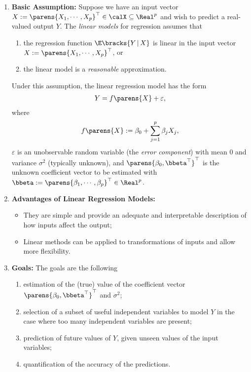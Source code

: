 \documentclass[12pt]{article}
\begin{document}
\begin{enumerate}[label=\textbf{\arabic*.}]

	\item \textbf{Basic Assumption:} Suppose we have an input vector $X := \parens{X_1, \cdots, X_{p}}^\top \in \calX \subseteq \Real^p$ and wish to predict a real-valued output $Y$. The \emph{linear models} for regression assumes that 
	\begin{enumerate}
		\item the regression function $\E \bracks{Y \,\vert\, X}$ is linear in the input vector $X := \parens{X_1, \cdots, X_{p}}^\top$, or 
		\item the linear model is a \textit{reasonable} approximation. 
	\end{enumerate}
	Under this assumption, the linear regression model has the form 
	\begin{align}\label{eq-linear-model}
		Y = f \parens{X} + \varepsilon, 
	\end{align}
	where 
	\begin{align}
		f \parens{X} := \beta_0 + \sum_{j=1}^{p} \beta_{j} X_j, 
	\end{align}
	$\varepsilon$ is an unobservable random variable (the \emph{error component}) with mean 0 and variance $\sigma^2$ (typically unknown), and $\parens{\beta_0, \bbeta^\top}^\top$ is the unknown coefficient vector to be estimated with $\bbeta := \parens{\beta_1, \cdots, \beta_{p}}^\top \in \Real^{p}$. 
	
	\item \textbf{Advantages of Linear Regression Models:} 
	\begin{itemize}
		\item They are simple and provide an adequate and interpretable description of how inputs affect the output; 
		\item Linear methods can be applied to transformations of inputs and allow more flexibility. 
	\end{itemize}
	
	\item \textbf{Goals:} The goals are the following 
	\begin{enumerate}
		\item estimation of the (true) value of the coefficient vector $\parens{\beta_0, \bbeta^\top}^\top$ and $\sigma^2$; 
		\item selection of a subset of useful independent variables to model $Y$ in the case where too many independent variables are present; 
		\item prediction of future values of $Y$, given unseen values of the input variables; 
		\item quantification of the accuracy of the predictions. 
	\end{enumerate}
		
\end{enumerate}
\end{document}
